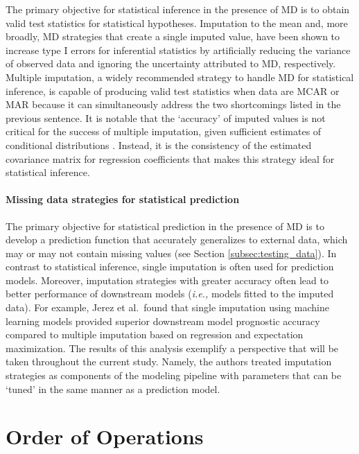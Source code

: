 \documentclass[AMA,STIX1COL,doublespace]{WileyNJD-v2}
\begin{document}
The primary objective for statistical inference in the presence of MD is
to obtain valid test statistics for statistical hypotheses. Imputation
to the mean and, more broadly, MD strategies that create a single
imputed value, have been shown to increase type I errors for inferential
statistics by artificially reducing the variance of observed data and
ignoring the uncertainty attributed to MD, respectively. Multiple
imputation, a widely recommended strategy to handle MD for statistical
inference, is capable of producing valid test statistics when data are
MCAR or MAR because it can simultaneously address the two shortcomings
listed in the previous sentence. It is notable that the `accuracy' of
imputed values is not critical for the success of multiple imputation,
given sufficient estimates of conditional distributions
\citep{van2018flexible}. Instead, it is the consistency of the estimated
covariance matrix for regression coefficients that makes this strategy
ideal for statistical inference.

\paragraph{Missing data strategies for statistical prediction}

The primary objective for statistical prediction in the presence of MD
is to develop a prediction function that accurately generalizes to
external data, which may or may not contain missing values (see Section
\ref{subsec:testing_data}). In contrast to statistical inference, single
imputation is often used for prediction models. Moreover, imputation
strategies with greater accuracy often lead to better performance of
downstream models (\textit{i.e., }models fitted to the imputed data).
For example, Jerez et al.~found that single imputation using machine
learning models provided superior downstream model prognostic accuracy
compared to multiple imputation based on regression and expectation
maximization.\citep{jerez2010missing} The results of this analysis
exemplify a perspective that will be taken throughout the current study.
Namely, the authors treated imputation strategies as components of the
modeling pipeline with parameters that can be `tuned' in the same manner
as a prediction model.

\section{Order of Operations} \label{sec:oop}
\end{document}
